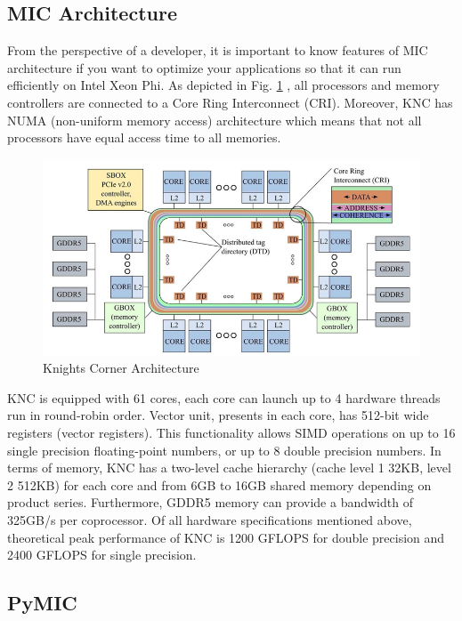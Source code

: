 \subsection{MIC Architecture}

From the perspective of a developer, it is important to know features of MIC architecture if you want to optimize your applications so that it can run efficiently on Intel Xeon Phi. As depicted in Fig. \ref{fig:arch} \cite{phibook}, all processors and memory controllers are connected to a Core Ring Interconnect (CRI). Moreover, KNC has NUMA (non-uniform memory access) architecture which means that not all processors have equal access time to all memories.

\begin{figure}[h]
\centering
\includegraphics[scale=0.45]{img/mic-arch.png}
\caption{Knights Corner Architecture}
\label{fig:arch}
\end{figure}

KNC is equipped with 61 cores, each core can launch up to 4 hardware threads run in round-robin order. Vector unit, presents in each core, has 512-bit wide registers (vector registers). This functionality allows SIMD operations on up to 16 single precision floating-point numbers, or up to 8 double precision numbers. In terms of memory, KNC has a two-level cache hierarchy (cache level 1 32KB, level 2 512KB) for each core and from 6GB to 16GB shared memory depending on product series. Furthermore, GDDR5 memory can provide a bandwidth of 325GB/s per coprocessor. Of all hardware specifications mentioned above, theoretical peak performance of KNC is 1200 GFLOPS for double precision and 2400 GFLOPS for single precision.

\subsection{PyMIC}

